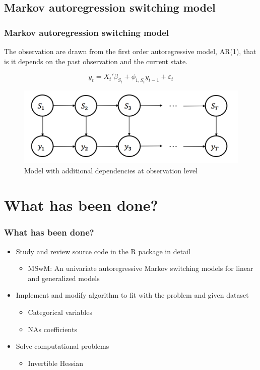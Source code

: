 \documentclass{beamer}
\begin{document}
\subsection{Markov autoregression switching model} %

\begin{frame}
\frametitle{Markov autoregression switching model}
The observation are drawn from the first order autoregressive model, AR(1), that is it depends on the past observation and the current state.

$$y_{t} = {X_{t}}' \beta_{S_{t}} + \phi_{1,S_{t}} y_{t-1} + \varepsilon_{t}$$

\begin{figure}
	\includegraphics[width=0.5\linewidth]{msm-ar}
	\caption{Model with additional dependencies at observation level}
\end{figure}
\end{frame}

\section{What has been done?}
\begin{frame}
\frametitle{What has been done?}
\begin{itemize}
	\item Study and review source code  in the R package in detail
	\begin{itemize}
		\item MSwM: An univariate autoregressive Markov switching models for linear and generalized models
	\end{itemize}
	
	\item Implement and modify algorithm to fit with the problem and given dataset
	\begin{itemize}
		\item Categorical variables
		\item NAs coefficients
	\end{itemize}
	
	\item Solve computational problems
	\begin{itemize}
		\item Invertible Hessian
	\end{itemize}
\end{itemize}
\end{frame}
\end{document}
